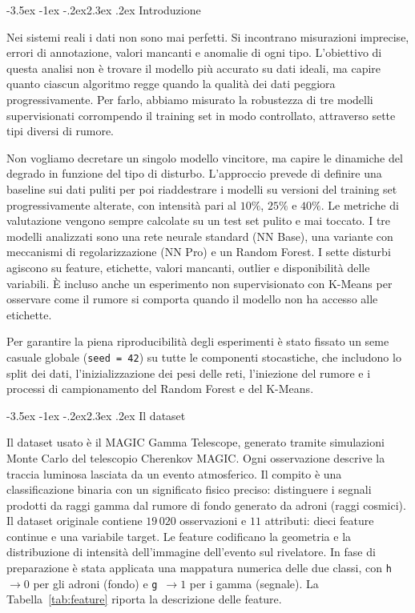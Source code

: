 \documentclass[12pt,a4paper]{article}
\makeatletter
\renewcommand\section{\@startsection{section}{1}{\z@}%
  {-3.5ex \@plus -1ex \@minus -.2ex}{2.3ex \@plus.2ex}%
  {\normalfont\Large\bfseries}}
\makeatother
\begin{document}
\section{Introduzione}\label{sec:intro}

Nei sistemi reali i dati non sono mai perfetti. Si incontrano misurazioni
imprecise, errori di annotazione, valori mancanti e anomalie di ogni tipo.
L'obiettivo di questa analisi non è trovare il modello più accurato su dati
ideali, ma capire quanto ciascun algoritmo regge quando la qualità dei dati
peggiora progressivamente. Per farlo, abbiamo misurato la robustezza di tre
modelli supervisionati corrompendo il training set in modo controllato,
attraverso sette tipi diversi di rumore.

Non vogliamo decretare un singolo modello vincitore, ma capire le dinamiche del
degrado in funzione del tipo di disturbo. L'approccio prevede di definire una 
baseline sui dati puliti per poi 
riaddestrare i modelli su versioni del training set progressivamente 
alterate, con intensità pari al $10\%$, $25\%$ e $40\%$. 
Le metriche di valutazione vengono sempre calcolate su un test set
pulito e mai toccato. I tre modelli analizzati sono una rete neurale standard
(NN Base), una variante con meccanismi di regolarizzazione (NN Pro) e un Random
Forest. I sette disturbi agiscono su feature, etichette, valori mancanti,
outlier e disponibilità delle variabili. È incluso anche un esperimento non
supervisionato con K-Means per osservare come il rumore si comporta quando il
modello non ha accesso alle etichette.

Per garantire la piena riproducibilità degli esperimenti è stato fissato un seme
casuale globale (\texttt{seed = 42}) su tutte le componenti stocastiche, che
includono lo split dei dati, l'inizializzazione dei pesi delle reti, l'iniezione
del rumore e i processi di campionamento del Random Forest e del K-Means.

\section{Il dataset}\label{sec:dataset}

Il dataset usato è il MAGIC Gamma Telescope, generato tramite simulazioni Monte
Carlo del telescopio Cherenkov MAGIC. Ogni osservazione descrive la traccia
luminosa lasciata da un evento
atmosferico. Il compito è una classificazione binaria
con un significato fisico preciso: distinguere i segnali prodotti da raggi gamma
dal rumore di fondo generato da adroni (raggi cosmici).
Il dataset originale contiene $19\,020$ osservazioni e $11$ attributi: dieci
feature continue e una variabile target. Le feature codificano la geometria e la
distribuzione di intensità dell'immagine dell'evento sul rivelatore. In fase di
preparazione è stata applicata una mappatura numerica delle due classi, con
\texttt{h}~$\rightarrow 0$ per gli adroni (fondo) e \texttt{g}~$\rightarrow 1$
per i gamma (segnale). La Tabella~\ref{tab:feature} riporta la descrizione delle
feature.
\end{document}
